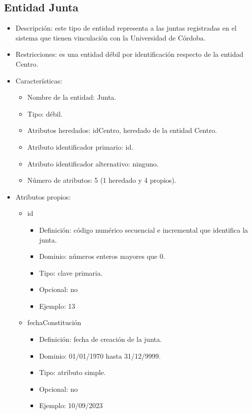 \subsection{Entidad Junta}
\begin{itemize}
    \item Descripción: este tipo de entidad representa a las juntas registradas en el sistema que tienen vinculación con la Universidad de Córdoba.
    \item Restricciones: es una entidad débil por identificación respecto de la entidad Centro.
    \item Características:
    \begin{itemize}
        \item Nombre de la entidad: Junta.
        \item Tipo: débil.
        \item Atributos heredados: idCentro, heredado de la entidad Centro.
        \item Atributo identificador primario: id.
        \item Atributo identificador alternativo: ninguno.
        \item Número de atributos: 5 (1 heredado y 4 propios).
    \end{itemize}

    \item Atributos propios:
    \begin{itemize}
        \item id
        \begin{itemize}
            \item Definición: código numérico secuencial e incremental que identifica la junta.
            \item Dominio: números enteros mayores que 0.
            \item Tipo: clave primaria.
            \item Opcional: no
            \item Ejemplo: 13
        \end{itemize}

        \item fechaConstitución
        \begin{itemize}
            \item Definición: fecha de creación de la junta.
            \item Dominio: 01/01/1970 hasta 31/12/9999.
            \item Tipo: atributo simple.
            \item Opcional: no
            \item Ejemplo: 10/09/2023
        \end{itemize}


\end{itemize}
\end{itemize}
